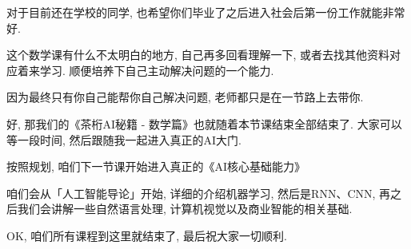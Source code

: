 对于目前还在学校的同学, 也希望你们毕业了之后进入社会后第一份工作就能非常好. 

这个数学课有什么不太明白的地方, 自己再多回看理解一下, 或者去找其他资料对应着来学习. 顺便培养下自己主动解决问题的一个能力. 

因为最终只有你自己能帮你自己解决问题, 老师都只是在一节路上去带你. 

好, 那我们的《茶桁AI秘籍 - 数学篇》也就随着本节课结束全部结束了. 大家可以等一段时间, 然后跟随我一起进入真正的AI大门. 

按照规划, 咱们下一节课开始进入真正的《AI核心基础能力》

咱们会从「人工智能导论」开始, 详细的介绍机器学习, 然后是RNN、CNN, 再之后我们会讲解一些自然语言处理, 计算机视觉以及商业智能的相关基础. 

OK, 咱们所有课程到这里就结束了, 最后祝大家一切顺利. 

